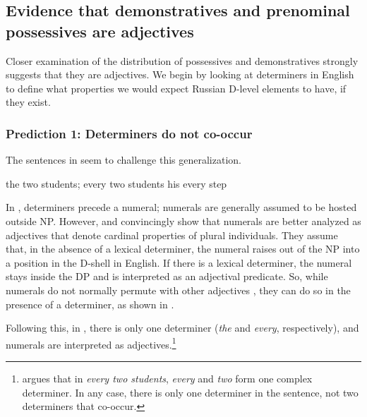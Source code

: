 \documentclass[output=paper,
colorlinks,
citecolor=brown,
newtxmath
]{langscibook}
\begin{document}
\subsection{Evidence that demonstratives and prenominal possessives are adjectives}

Closer examination of the distribution of possessives and demonstratives strong\-ly suggests that they are adjectives. We begin by looking at determiners in English to define what properties we would expect Russian D-level elements to have, if they exist.

\subsubsection{Prediction 1: Determiners do not co-occur}


\ea{}
\z\z

\noindent The sentences in  seem to challenge this generalization.


\ea\label{determiners}
    \ea the two students; every two students\label{twostudents}
    \ex his every step\label{hisstep}
\z\z

\noindent In , determiners precede a numeral; numerals are generally assumed to be hosted outside NP. However, \citet{Landman2003,Landman2004} and \citet{Rothstein2013,Rothstein2017} convincingly show that numerals are better analyzed as adjectives that denote cardinal properties of plural individuals. They assume that, in the absence of a lexical determiner, the numeral raises out of the NP into a position in the D-shell in English. If there is a lexical determiner, the numeral stays inside the DP and is interpreted as an adjectival predicate. So, while numerals do not normally permute with other adjectives , they can do so in the presence of a determiner, as shown in . 


\ea
    \label{fiftylions}
     \hfill \citep[217]{Landman2003}
\z\z

\noindent Following this, in , there is only one determiner (\textit{the} and \textit{every}, respectively), and numerals are interpreted as adjectives.\footnote{\citet{Landman2004} argues that in \textit{every two students}, \textit{every} and \textit{two} form one complex determiner. In any case, there is only one determiner in the sentence, not two determiners that co-occur.}
\end{document}
